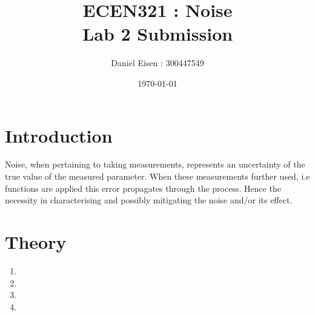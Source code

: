 \documentclass[11pt]{article}
\title{ECEN321 : Noise \\ Lab 2 Submission}
\author{Daniel Eisen : 300447549}
\date{\today}
\begin{document}
\maketitle
\section{Introduction}
Noise, when pertaining to taking measurements, represents an uncertainty of the true value of the measured parameter. When these measurements further used, i.e functions are applied this error propagates through the process. Hence the necessity in characterising and possibly mitigating the noise and/or its effect.

\section{Theory}
\begin{enumerate}
        \item 
        \item 
        \item 
        \item 
\end{enumerate}

\newpage
\end{document}

